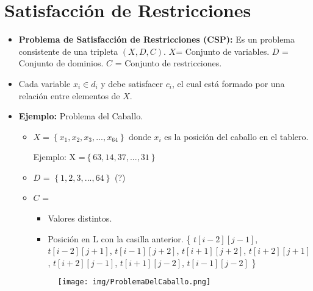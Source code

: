 \documentclass{templateNote}
\begin{document}
\newpage
\section*{Satisfacción de Restricciones}
\begin{itemize}
    \item \textbf{Problema de Satisfacción de Restricciones (CSP):} Es un problema consistente de una tripleta $(X,D,C)$.
    \subitem $X$= Conjunto de variables.
    \subitem $D$ = Conjunto de dominios.
    \subitem $C$ = Conjunto de restricciones.
    
    \item Cada variable $x_i \in d_i$ y debe satisfacer $c_i$, el cual está formado por una relación entre elementos de $X$.
    
    \item \textbf{Ejemplo:} Problema del Caballo.
    \begin{itemize}
        \item $X = \left\{ x_1, x_2, x_3, ..., x_{64} \right\}$ donde $x_i$ es la posición del caballo en el tablero.
        
        Ejemplo: X =$\left\{ 63, 14, 37, ..., 31 \right\}$
        
        \item $D$ = $\left\{ 1, 2, 3, ..., 64 \right\}$ \quad (?)
        \item $C$ = \begin{itemize} \item Valores distintos. \item Posición en L con la casilla anterior. \{ $t[i-2][j-1]$, $t[i-2][j+1]$, $t[i-1][j+2]$, $t[i+1][j+2]$, $t[i+2][j+1]$, $t[i+2][j-1]$, $t[i+1][j-2]$, $t[i-1][j-2]$ \} \end{itemize}
        \begin{figure}[H]
            \centering
            \texttt{[image: img/ProblemaDelCaballo.png]}
        \end{figure}
    \end{itemize}
\end{itemize}

\newpage
\end{document}
